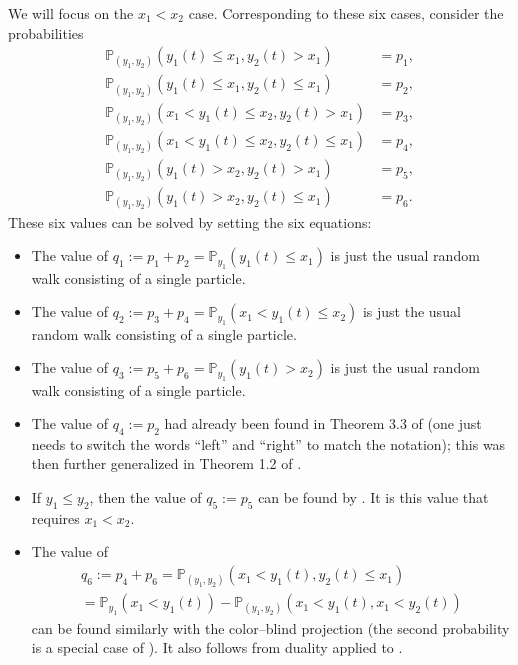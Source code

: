 \documentclass{ximera}
\begin{document}
  
We will focus on the $x_1<x_2$ case. Corresponding to these six cases, consider the probabilities
\begin{align*}
\mathbb{P}_{(y_1,y_2)}\left(  y_1(t) \leq x_1,y_2(t)>x_1 \right) &= p_1, \\
\mathbb{P}_{(y_1,y_2)}\left( y_1(t) \leq x_1,y_2(t)\le x_1 \right) &=p_2, \\
\mathbb{P}_{(y_1,y_2)}\left( x_1<y_1(t)\le x_2,y_2(t)>x_1  \right) &= p_3,\\
\mathbb{P}_{(y_1,y_2)}\left( x_1<y_1(t)\le x_2,y_2(t)\le x_1 \right) &= p_4,\\
\mathbb{P}_{(y_1,y_2)}\left( y_1(t)> x_2,y_2(t)>x_1 \right) &=p_5, \\
\mathbb{P}_{(y_1,y_2)}\left( y_1(t)> x_2,y_2(t)\le x_1 \right) &= p_6 .
\end{align*}
These six values can be solved by setting the six equations:
\begin{itemize}


\item 
 The value of $q_1:=p_1+p_2 = \mathbb{P}_{y_1}( y_1(t) \leq x_1)$ is just the usual random walk consisting of a single particle.
 
 \item
 The value of $q_2:=p_3+p_4= \mathbb{P}_{y_1}( x_1< y_1(t) \leq x_2)$ is just the usual random walk consisting of a single particle.
 
 \item
 The value of $q_3:=p_5+p_6 = \mathbb{P}_{y_1}( y_1(t) > x_2)$  is just the usual random walk consisting of a single particle.
 
 \item
The value of $q_4:=p_2$ had already been found in Theorem 3.3 of \cite{Kor-Lee} (one just needs to switch the words ``left'' and ``right'' to match the notation); this was then further generalized in Theorem 1.2 of \cite{Lee-Wang-2017}. 

 \item
If $y_1 \leq y_2$, then the value of $q_5:=p_5$ can be found by \cite{Kua21}. It is this value that requires $x_1<x_2$.



\item
The value of 
\begin{multline*}
q_6:=p_4+p_6 = \mathbb{P}_{(y_1,y_2)}(x_1<y_1(t), y_2(t) \leq x_1) \\
= \mathbb{P}_{y_1}(x_1<y_1(t)) - \mathbb{P}_{(y_1,y_2)}(x_1<y_1(t), x_1 < y_2(t) )
\end{multline*}
can be found similarly with the color--blind projection (the second probability is a special case of \cite{Kua21}). It also follows from duality applied to \cite{Lee-Wang-2017}.
 
\end{itemize}
\end{document}
